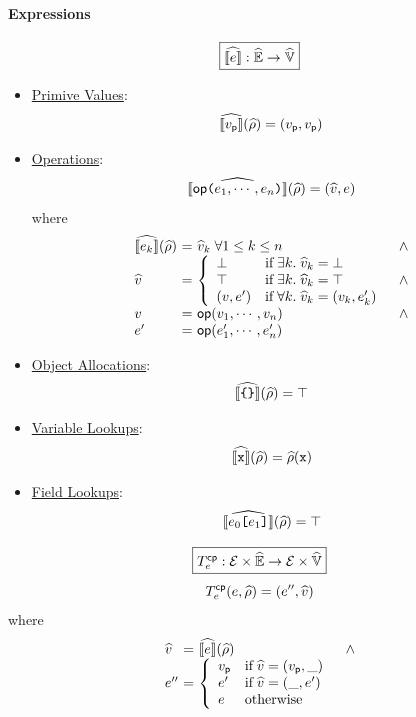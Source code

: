 \paragraph{Expressions}
\[
  \framebox{$\asem{\expr}: \aenvset \rightarrow \avalset$}
\]
\begin{itemize}
  \item \underline{Primive Values}:
    \[
      \widehat{\llbracket{v_{\textsf{p}}}\rrbracket}(\widehat{\rho}) = (v_{\textsf{p}}, v_{\textsf{p}})
    \]
  \item \underline{Operations}:
    \[
      \widehat{\llbracket{\textsf{op}\texttt{(}e_1, \cdots, e_n \texttt{)}}\rrbracket}(\widehat{\rho}) =
      (\widehat{v}, e)
    \]
    where
    \[
      \begin{array}{l@{~}c@{~}ll}
        \asem{\expr_k}(\aenv) &=& \aval_k \; \forall 1 \leq k \leq n
        &\wedge\\
        \aval &=& \left\{
          \begin{array}{ll}
            \bot & \text{if} \; \exists k. \; \aval_k = \bot\\
            \top & \text{if} \; \exists k. \; \aval_k = \top\\
            (\val, \expr') &
            \text{if} \; \forall k. \; \aval_k = (\val_k, \expr'_k)\\
          \end{array}
        \right. &\wedge\\
        \val &=& \op(\val_1, \cdots, \val_n) &\wedge\\
        \expr' &=& \op(\expr'_1, \cdots, \expr'_n)\\
      \end{array}
    \]
  \item \underline{Object Allocations}:
    \[
      \widehat{\llbracket{\texttt{\{}\texttt{\}}}\rrbracket}(\widehat{\rho}) = \top
    \]
  \item \underline{Variable Lookups}:
    \[
      \widehat{\llbracket{\texttt{x}}\rrbracket}(\widehat{\rho}) = \widehat{\rho}(\texttt{x})
    \]
  \item \underline{Field Lookups}:
    \[
      \widehat{\llbracket{e_0 \texttt{[}e_1 \texttt{]}}\rrbracket}(\widehat{\rho}) = \top
    \]
\end{itemize}
\[
  \framebox{$\cptransforme: \exprset \times \aenvset \rightarrow \exprset \times
  \avalset$}
\]
\[
  T^{\textsf{cp}}_e(e, \widehat{\rho}) = (e'', \widehat{v})
\]
where
\[
  \begin{array}{l@{~}c@{~}ll}
    \aval &=& \asem{\expr}(\aenv) &\wedge\\
    \expr'' &=& \left\{
      \begin{array}{ll}
        \pval & \text{if} \; \aval = (\pval, \_)\\
        \expr' & \text{if} \; \aval = (\_, \expr')\\
        \expr & \text{otherwise}\\
      \end{array}
    \right.\\
  \end{array}
\]

